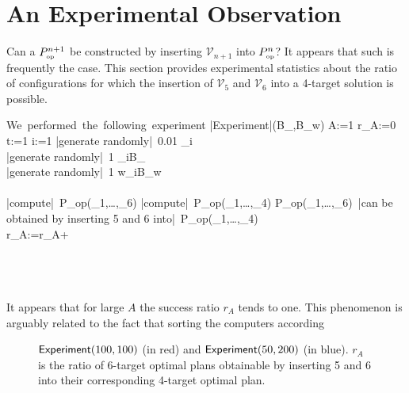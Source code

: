 \documentclass[11pt]{llncs}
\begin{document}
\section{An Experimental Observation}

Can a $P_{\mbox{{\tiny op}}}^{n+1}$ be constructed by inserting $\mathcal{V}_{n+1}$ into $P_{\mbox{{\tiny op}}}^n$? It appears that such is frequently the case. This section provides experimental statistics about the ratio of configurations for which the insertion of $\mathcal{V}_5$ and $\mathcal{V}_6$ into a 4-target solution is possible.

\begin{program}
\mbox{We performed the following experiment}
\PROC |Experiment|(B_\pi,B_w) \BODY
  \FOR A:=1  \DO
   r_A:=0\\
    \FOR t:=1  \DO
    \FOR i:=1  \DO
       |generate randomly|~0.01 \leq \epsilon_i\\
       |generate randomly|~1 \leq \pi_i\leq B_\pi\\
       |generate randomly|~1 \leq w_i\leq B_w \\
    \OD\\
     |compute|~P_{\mbox{{\tiny op}}}(_1,\ldots,_6)
     |compute|~P_{\mbox{{\tiny op}}}(_1,\ldots,_4)
     \IF P_{\mbox{{\tiny op}}}(_1,\ldots,_6)~|can be obtained by inserting 5 and 6 into|~P_{\mbox{{\tiny op}}}(_1,\ldots,_4)\\
     \THEN r_A:=r_A+\\
     \FI\\
     \OD\\
     \OD\\
\end{program}

It appears that for large $A$ the success ratio $r_A$ tends to one. This phenomenon is arguably related to the fact that sorting the computers according %

\begin{figure}[!h]
\begin{center}
\end{center}
\caption{$\mbox{{\sf Experiment}}(100,100)$ (in red) and $\mbox{{\sf Experiment}}(50,200)$ (in blue). $r_A$ is the ratio of 6-target optimal plans obtainable by inserting 5 and 6 into their corresponding 4-target optimal plan.}
\label{fig}
\end{figure}
\end{document}
